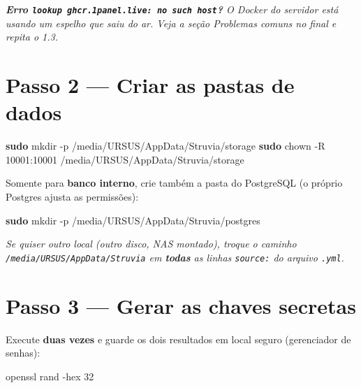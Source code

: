 \documentclass[
  10pt,
]{article}
\newenvironment{Shaded}{\begin{snugshade}}{\end{snugshade}}
\newcommand{\AttributeTok}[1]{\textcolor[rgb]{0.13,0.29,0.53}{#1}}
\newcommand{\ExtensionTok}[1]{#1}
\newcommand{\FunctionTok}[1]{\textcolor[rgb]{0.13,0.29,0.53}{\textbf{#1}}}
\newcommand{\NormalTok}[1]{#1}
\renewenvironment{quote}{\begin{oldquote}\small\itshape}{\end{oldquote}}
\begin{document}
\begin{quote}
\textbf{Erro \texttt{lookup\ ghcr.1panel.live:\ no\ such\ host}?} O
Docker do servidor está usando um espelho que saiu do ar. Veja a seção
\emph{Problemas comuns} no final e repita o 1.3.
\end{quote}

\hypertarget{passo-2-criar-as-pastas-de-dados}{%
\section{Passo 2 --- Criar as pastas de
dados}\label{passo-2-criar-as-pastas-de-dados}}

\begin{Shaded}
\begin{Highlighting}[]
\FunctionTok{sudo}\NormalTok{ mkdir }\AttributeTok{{-}p}\NormalTok{ /media/URSUS/AppData/Struvia/storage}
\FunctionTok{sudo}\NormalTok{ chown }\AttributeTok{{-}R}\NormalTok{ 10001:10001 /media/URSUS/AppData/Struvia/storage}
\end{Highlighting}
\end{Shaded}

Somente para \textbf{banco interno}, crie também a pasta do PostgreSQL
(o próprio Postgres ajusta as permissões):

\begin{Shaded}
\begin{Highlighting}[]
\FunctionTok{sudo}\NormalTok{ mkdir }\AttributeTok{{-}p}\NormalTok{ /media/URSUS/AppData/Struvia/postgres}
\end{Highlighting}
\end{Shaded}

\begin{quote}
Se quiser outro local (outro disco, NAS montado), troque o caminho
\texttt{/media/URSUS/AppData/Struvia} em \textbf{todas} as linhas
\texttt{source:} do arquivo \texttt{.yml}.
\end{quote}

\hypertarget{passo-3-gerar-as-chaves-secretas}{%
\section{Passo 3 --- Gerar as chaves
secretas}\label{passo-3-gerar-as-chaves-secretas}}

Execute \textbf{duas vezes} e guarde os dois resultados em local seguro
(gerenciador de senhas):

\begin{Shaded}
\begin{Highlighting}[]
\ExtensionTok{openssl}\NormalTok{ rand }\AttributeTok{{-}hex}\NormalTok{ 32}
\end{Highlighting}
\end{Shaded}
\end{document}

